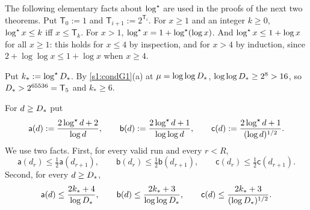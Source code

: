 The following elementary facts about $\log^{\star}$ are used in the proofs of the next two theorems. Put $\mathsf T_0:=1$ and $\mathsf T_{i+1}:=2^{\mathsf T_i}$. For $x\ge1$ and an integer $k\ge0$, $\log^{\star} x\le k$ iff $x\le\mathsf T_k$. For $x>1$, $\log^{\star} x=1+\log^{\star}(\log x)$. And $\log^{\star} x\le1+\log x$ for all $x\ge1$: this holds for $x\le4$ by inspection, and for $x>4$ by induction, since $2+\log\log x\le1+\log x$ when $x\ge4$.

Put $k_*:=\log^{\star}D_{*}$. By \ref{s1:condG1}(a) at $\mu=\log\log D_{*}$, $\log\log D_{*}\ge2^8>16$, so $D_{*}>2^{65536}=\mathsf T_5$ and $k_*\ge6$.

For $d\ge D_{*}$ put
\[
\mathsf a(d):=\frac{2\log^{\star} d+2}{\log d},\qquad \mathsf b(d):=\frac{2\log^{\star} d+1}{\log\log d},\qquad \mathsf c(d):=\frac{2\log^{\star} d+1}{(\log d)^{1/2}}.
\]
We use two facts. First, for every valid run and every $r<R$,
\begin{equation}\label{s6:eqTowerHalf}
\mathsf a(d_r)\le\tfrac12\mathsf a(d_{r+1}),\qquad \mathsf b(d_r)\le\tfrac12\mathsf b(d_{r+1}),\qquad \mathsf c(d_r)\le\tfrac12\mathsf c(d_{r+1}).
\end{equation}
Second, for every $d\ge D_{*}$,
\begin{equation}\label{s6:eqTowerEnd}
\mathsf a(d)\le\frac{2k_*+4}{\log D_{*}},\qquad \mathsf b(d)\le\frac{2k_*+3}{\log\log D_{*}},\qquad \mathsf c(d)\le\frac{2k_*+3}{(\log D_{*})^{1/2}}.
\end{equation}


